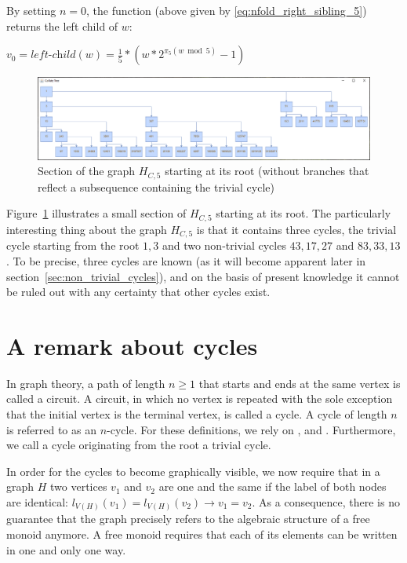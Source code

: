 \par\medskip
\noindent
By setting $n=0$, the function (above given by \ref{eq:nfold_right_sibling_5}) returns the left child of $w$:
\begin{center}
	$v_0=\textit{left-child}(w)=\frac{1}{5}*\left(w*2^{\pi_5(w\bmod 5)}-1\right)$
\end{center}

\begin{figure}
	\includegraphics[width=1.00\textwidth]{figures/h_c5b.png}
	\caption{Section of the graph $H_{C,5}$ starting at its root (without branches that reflect a subsequence containing the trivial cycle)}
	\label{fig:4}
\end{figure}

Figure~\ref{fig:4} illustrates a small section of $H_{C,5}$ starting at its root. The particularly interesting thing about the graph $H_{C,5}$ is that it contains three cycles, the trivial cycle starting from the root $1,3$ and two non-trivial cycles $43,17,27$ and $83,33,13$. To be precise, three cycles are known (as it will become apparent later in section~\ref{sec:non_trivial_cycles}), and on the basis of present knowledge it cannot be ruled out with any certainty that other cycles exist.

\section{A remark about cycles}
\label{sec:cycles}
In graph theory, a path of length $n\geq 1$ that starts and ends at the same vertex is called a circuit. A circuit, in which no vertex is repeated with the sole exception that the initial vertex is the terminal vertex, is called a cycle. A cycle of length $n$ is referred to as an $n$-cycle. For these definitions, we rely on \cite[p.~599]{Ref_Rosen}, \cite[p.~35]{Ref_Benjamin_Chartrand_Zhang} and \cite[p.~445]{Ref_Chartrand_Zhang}. Furthermore, we call a cycle originating from the root a trivial cycle.

\begin{remark}
In order for the cycles to become graphically visible, we now require that in a graph $H$ two vertices $v_1$ and $v_2$ are one and the same if the label of both nodes are identical: $l_{V(H)}(v_1)=l_{V(H)}(v_2)\rightarrow v_1=v_2$. As a consequence, there is no guarantee that the graph precisely refers to the algebraic structure of a free monoid anymore. A free monoid requires that each of its elements can be written in one and only one way.
\end{remark}

